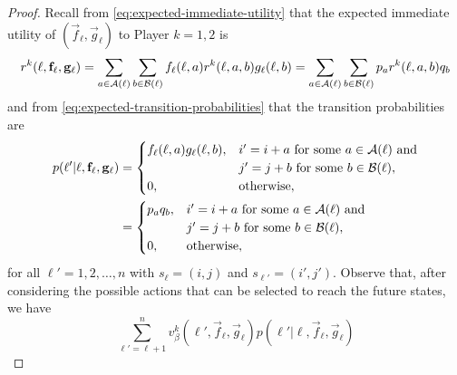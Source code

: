     \begin{proof}
        Recall from \eqref{eq:expected-immediate-utility} that the expected immediate utility of $(\vec{f}_\ell, \vec{g}_\ell)$ to Player $k = 1, 2$ is
        \begin{equation}  \label{temp:ordered-state-value-1}
            r^k(\ell, \mathbf{f}_\ell, \mathbf{g}_\ell)
                = \sum_{a \in \mathcal{A}(\ell)} \sum_{b \in \mathcal{B}(\ell)} f_\ell(\ell, a) r^k(\ell, a, b) g_\ell(\ell, b)
                = \sum_{a \in \mathcal{A}(\ell)} \sum_{b \in \mathcal{B}(\ell)} p_a r^k(\ell, a, b) q_b
        \end{equation}
        and from \eqref{eq:expected-transition-probabilities} that the transition probabilities are
        \begin{equation}  \label{temp:ordered-state-value-2}
        \begin{split}
            p(\ell' | \ell, \mathbf{f}_\ell, \mathbf{g}_\ell)
                &=
                \begin{cases}
                    f_\ell(\ell, a) g_\ell(\ell, b), & i' = i + a \text{ for some } a \in \mathcal{A}(\ell) \text{ and} \\
                                                     & j' = j + b \text{ for some } b \in \mathcal{B}(\ell), \\
                    0, & \text{otherwise}, \\
                \end{cases} \\
                &=
                \begin{cases}
                    p_a q_b, & i' = i + a \text{ for some } a \in \mathcal{A}(\ell) \text{ and}\\
                                                     & j' = j + b \text{ for some } b \in \mathcal{B}(\ell), \\
                    0, & \text{otherwise}, \\
                \end{cases} \\
        \end{split}
        \end{equation}
        for all $\ell' = 1, 2, \ldots, n$ with $s_\ell = (i, j)$ and $s_{\ell'} = (i', j')$.
        Observe that, after considering the possible actions that can be selected to reach the future states, we have
        \begin{equation} \label{temp:ordered-state-value-3}
            \sum_{\ell' = \ell + 1}^n v_\beta^k(\ell', \vec{f}_\ell, \vec{g}_\ell) p(\ell' | \ell, \vec{f}_\ell, \vec{g}_\ell)

\end{equation}
\end{proof}
